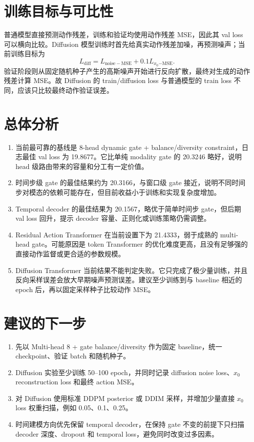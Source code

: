 \documentclass[UTF8,a4paper]{ctexart}
\begin{document}
\section{训练目标与可比性}
普通模型直接预测动作残差，训练和验证均使用动作残差 MSE，因此其 val loss 可以横向比较。Diffusion 模型训练时首先给真实动作残差加噪，再预测噪声；当前训练目标为
\[
 L_{\mathrm{diff}}=L_{\mathrm{noise-MSE}}+0.1L_{x_0\mathrm{-MSE}}.
\]
验证阶段则从固定随机种子产生的高斯噪声开始进行反向扩散，最终对生成的动作残差计算 MSE。故 Diffusion 的 train/diffusion loss 与普通模型的 train loss 不同，应该只比较最终动作验证误差。

\section{总体分析}
\begin{enumerate}
  \item 当前最可靠的基线是 8-head dynamic gate + balance/diversity constraint，日志最佳 val loss 为 19.8677。它比单纯 modality gate 的 20.3246 略好，说明 head 级路由带来的容量和分工有一定价值。
  \item 时间步级 gate 的最佳结果约为 20.3166，与窗口级 gate 接近，说明不同时间步对模态的依赖可能存在，但目前收益小于训练和实现复杂度增加。
  \item Temporal decoder 的最佳结果为 20.1567，略优于简单时间步 gate，但后期 val loss 回升，提示 decoder 容量、正则化或训练策略仍需调整。
  \item Residual Action Transformer 在当前设置下为 21.4333，弱于成熟的 multi-head gate。可能原因是 token Transformer 的优化难度更高，且没有足够强的直接动作监督或更合适的参数规模。
  \item Diffusion Transformer 当前结果不能判定失败。它只完成了极少量训练，并且反向采样误差会放大早期噪声预测误差。建议至少训练到与 baseline 相近的 epoch 后，再以固定采样种子比较动作 MSE。
\end{enumerate}

\section{建议的下一步}
\begin{enumerate}
  \item 先以 Multi-head 8 + gate balance/diversity 作为固定 baseline，统一 checkpoint、验证 batch 和随机种子。
  \item Diffusion 实验至少训练 50--100 epoch，并同时记录 diffusion noise loss、$x_0$ reconstruction loss 和最终 action MSE。
  \item 对 Diffusion 使用标准 DDPM posterior 或 DDIM 采样，并增加少量直接 $x_0$ loss 权重扫描，例如 0.05、0.1、0.25。
  \item 时间建模方向优先保留 temporal decoder，在保持 gate 不变的前提下只扫描 decoder 深度、dropout 和 temporal loss，避免同时改变过多因素。
\end{enumerate}
\end{document}
